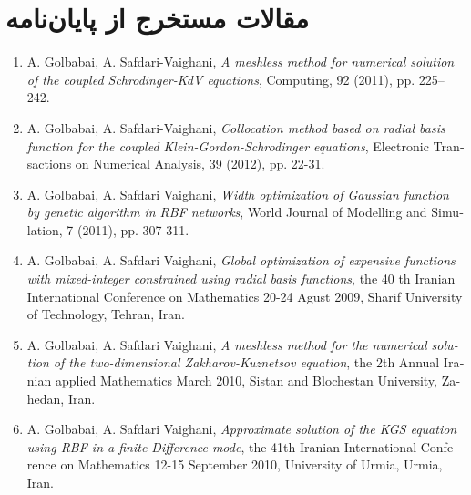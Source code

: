 
\chapter*{مقالات مستخرج از پایان‌نامه}
\vspace{.5cm}

 
\begin{latin}
\begin{enumerate}
%
\item  {A. Golbabai, A. Safdari-Vaighani},
\textit{ A meshless method for numerical solution of the coupled Schrodinger-KdV equations},
{ Computing, 92 (2011), pp. 225–242}.



\item  {A. Golbabai, A. Safdari-Vaighani},
\textit{Collocation method based on radial basis function for the coupled Klein-Gordon-Schrodinger equations},
{Electronic Transactions on Numerical Analysis, 39 (2012), pp. 22-31.}


\item {A. Golbabai, A. Safdari Vaighani},
\textit{Width optimization of Gaussian function by genetic algorithm in RBF networks},
{World Journal of Modelling and Simulation, 7 (2011), pp. 307-311. }

\item {A. Golbabai, A. Safdari Vaighani},
\textit{Global optimization of expensive functions with mixed-integer constrained using radial basis functions},
{the 40 th Iranian International Conference on Mathematics 20-24 Agust  2009,  Sharif University of Technology, Tehran, Iran.}

\item {A. Golbabai, A. Safdari Vaighani},
\textit{A meshless method for the numerical solution of the two-dimensional Zakharov-Kuznetsov equation},
{the 2th Annual Iranian applied Mathematics March  2010,  Sistan and Blochestan University, Zahedan, Iran.}

\item {A. Golbabai, A. Safdari Vaighani},
\textit{Approximate solution of the KGS equation using RBF in a finite-Difference mode},
{the 41th Iranian International Conference on Mathematics 12-15 September 2010, University of Urmia, Urmia, Iran.}


\end{enumerate}
\end{latin}